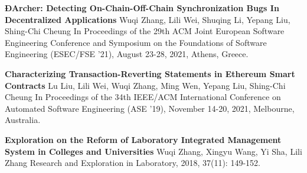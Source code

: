 %
%
%


\begin{scholarship}
	{\textbf{ÐArcher: Detecting On-Chain-Off-Chain Synchronization Bugs In Decentralized Applications}}
	{Wuqi Zhang, Lili Wei, Shuqing Li, Yepang Liu, Shing-Chi Cheung}
	\scholarshipentry{}
	{In Proceedings of the 29th ACM Joint European Software Engineering Conference and Symposium on the Foundations of Software Engineering (ESEC/FSE '21), August 23-28, 2021, Athens, Greece.}

	{\textbf{Characterizing Transaction-Reverting Statements in Ethereum Smart Contracts}}
	{Lu Liu, Lili Wei, Wuqi Zhang, Ming Wen, Yepang Liu, Shing-Chi Cheung}
	\scholarshipentry{}
	{In Proceedings of the 34th IEEE/ACM International Conference on Automated Software Engineering (ASE ’19), November 14-20, 2021, Melbourne, Australia.}

	{\textbf{Exploration on the Reform of Laboratory Integrated Management System in Colleges and Universities}}
	{Wuqi Zhang, Xingyu Wang, Yi Sha, Lili Zhang}
	\scholarshipentry{}
	{Research and Exploration in Laboratory, 2018, 37(11): 149-152.}
\end{scholarship}